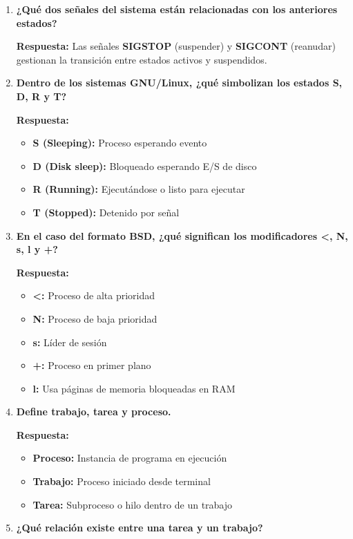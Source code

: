 \documentclass[a4paper,12pt]{article}
\begin{document}
\begin{enumerate}[label=\textbf{Pregunta \arabic*.},left=0pt,itemsep=1.5em]
\item \textbf{¿Qué dos señales del sistema están relacionadas con los anteriores estados?}

\textbf{Respuesta:} Las señales \textbf{SIGSTOP} (suspender) y \textbf{SIGCONT} (reanudar) gestionan la transición entre estados activos y suspendidos.

\item \textbf{Dentro de los sistemas GNU/Linux, ¿qué simbolizan los estados S, D, R y T?}

\textbf{Respuesta:}
\begin{itemize}
    \item \textbf{S (Sleeping):} Proceso esperando evento
    \item \textbf{D (Disk sleep):} Bloqueado esperando E/S de disco
    \item \textbf{R (Running):} Ejecutándose o listo para ejecutar
    \item \textbf{T (Stopped):} Detenido por señal
\end{itemize}

\item \textbf{En el caso del formato BSD, ¿qué significan los modificadores <, N, s, l y +?}

\textbf{Respuesta:}
\begin{itemize}
    \item \textbf{<:} Proceso de alta prioridad
    \item \textbf{N:} Proceso de baja prioridad
    \item \textbf{s:} Líder de sesión
    \item \textbf{+:} Proceso en primer plano
    \item \textbf{l:} Usa páginas de memoria bloqueadas en RAM
\end{itemize}

\item \textbf{Define trabajo, tarea y proceso.}

\textbf{Respuesta:}
\begin{itemize}
    \item \textbf{Proceso:} Instancia de programa en ejecución
    \item \textbf{Trabajo:} Proceso iniciado desde terminal
    \item \textbf{Tarea:} Subproceso o hilo dentro de un trabajo
\end{itemize}

\item \textbf{¿Qué relación existe entre una tarea y un trabajo?}


\end{enumerate}
\end{document}
